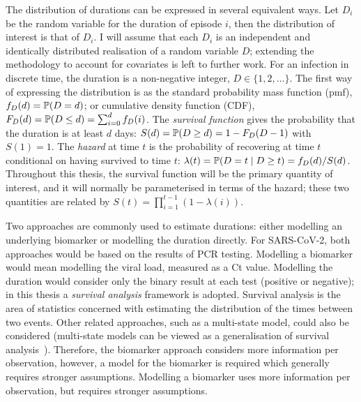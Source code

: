 \documentclass[thesis.tex]{subfiles}
\begin{document}
The distribution of durations can be expressed in several equivalent ways.
Let $D_i$ be the random variable for the duration of episode $i$, then the distribution of interest is that of $D_i$.
I will assume that each $D_i$ is an independent and identically distributed realisation of a random variable $D$; extending the methodology to account for covariates is left to further work.
For an infection in discrete time, the duration is a non-negative integer, \ie $D \in \{1, 2, \dots\}$.
The first way of expressing the distribution is as the standard probability mass function (pmf), $f_{D}(d) = \operatorname{\mathbb{P}}(D = d)$; or cumulative density function (CDF), $F_{D}(d) = \operatorname{\mathbb{P}}(D \leq d) = \sum_{i=0}^d f_{D}(i)$.
The \emph{survival function} gives the probability that the duration is at least $d$ days: $S(d) = \operatorname{\mathbb{P}}(D \geq d) = 1 - F_{D}(D - 1)$ with $S(1) = 1$.
The \emph{hazard} at time $t$ is the probability of recovering at time $t$ conditional on having survived to time $t$: $\lambda(t) = \operatorname{\mathbb{P}}(D = t \mid D \geq t) = f_{D}(d) / S(d)$.
Throughout this thesis, the survival function will be the primary quantity of interest, and it will normally be parameterised in terms of the hazard; these two quantities are related by $S(t) = \prod_{i=1}^{t-1} (1 - \lambda(i))$.

Two approaches are commonly used to estimate durations: either modelling an underlying biomarker or modelling the duration directly.
For SARS-CoV-2, both approaches would be based on the results of PCR testing.
Modelling a biomarker would mean modelling the viral load, measured as a Ct value.
Modelling the duration would consider only the binary result at each test (positive or negative); in this thesis a \emph{survival analysis} framework is adopted.
Survival analysis is the area of statistics concerned with estimating the distribution of the times between two events.
Other related approaches, such as a multi-state model, could also be considered (multi-state models can be viewed as a generalisation of survival analysis~\autocite{jacksonMSM}).
Therefore, the biomarker approach considers more information per observation, however, a model for the biomarker is required which generally requires stronger assumptions.
Modelling a biomarker uses more information per observation, but requires stronger assumptions.

\end{document}
